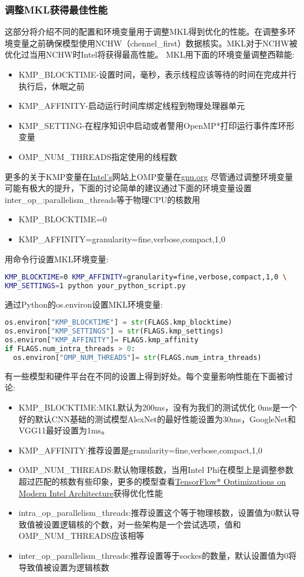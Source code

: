 \subsubsection{调整MKL获得最佳性能}
这部分将介绍不同的配置和环境变量用于调整MKL得到优化的性能。在调整多环境变量之前确保模型使用NCHW（chennel\_first）数据核实。MKL对于NCHW被优化过当用NCHW时Intel将获得最高性能。
MKL用下面的环境变量调整西鞥能:
\begin{itemize}
	\item KMP\_BLOCKTIME-设置时间，毫秒，表示线程应该等待的时间在完成并行执行后，休眠之前
	\item KMP\_AFFINITY-启动运行时间库绑定线程到物理处理器单元
	\item KMP\_SETTING-在程序知识中启动或者警用OpenMP*打印运行事件库环形变量
	\item OMP\_NUM\_THREADS指定使用的线程数
\end{itemize}
更多的关于KMP变量在\href{https://software.intel.com/en-us/node/522775}{Intel's}网站上OMP变量在\href{https://gcc.gnu.org/onlinedocs/libgomp/Environment-Variables.html}{gnu.org}
尽管通过调整环境变量可能有极大的提升，下面的讨论简单的建议通过下面的环境变量设置inter\_op\_:parallelism\_threads等于物理CPU的核数用
\begin{itemize}
	\item KMP\_BLOCKTIME=0
	\item KMP\_AFFINITY=granularity=fine,verbose,compact,1,0
\end{itemize}
用命令行设置MKL环境变量:
\begin{lstlisting}[language=Bash]
KMP_BLOCKTIME=0 KMP_AFFINITY=granularity=fine,verbose,compact,1,0 \
KMP_SETTINGS=1 python your_python_script.py
\end{lstlisting}
通过Python的os.environ设置MKL环境变量:
\begin{lstlisting}[language=Python]
os.environ["KMP_BLOCKTIME"] = str(FLAGS.kmp_blocktime)
os.environ["KMP_SETTINGS"] = str(FLAGS.kmp_settings)
os.environ["KMP_AFFINITY"]= FLAGS.kmp_affinity
if FLAGS.num_intra_threads > 0:
  os.environ["OMP_NUM_THREADS"]= str(FLAGS.num_intra_threads)
\end{lstlisting}
有一些模型和硬件平台在不同的设置上得到好处。每个变量影响性能在下面被讨论:
\begin{itemize}
\item KMP\_BLOCKTIME:MKL默认为200ms，没有为我们的测试优化 0ms是一个好的默认CNN基础的测试模型AlexNet的最好性能设置为30ms，GoogleNet和VGG11最好设置为1ms。
\item KMP\_AFFINITY:推荐设置是granularity=fine,verbose,compact,1,0
\item OMP\_NUM\_THREADS:默认物理核数，当用Intel Phi在模型上是调整参数超过匹配的核数有些印象，更多的模型查看\href{https://software.intel.com/en-us/articles/tensorflow-optimizations-on-modern-intel-architecture}{TensorFlow* Optimizations on Modern Intel Architecture}获得优化性能
\item intra\_op\_parallelism\_threads:推荐设置这个等于物理核数，设置值为0默认导致值被设置逻辑核的个数，对一些架构是一个尝试选项，值和OMP\_NUM\_THREADS应该相等
\item inter\_op\_parallelism\_threads:推荐设置等于sockes的数量，默认设置值为0将导致值被设置为逻辑核数
\end{itemize}
